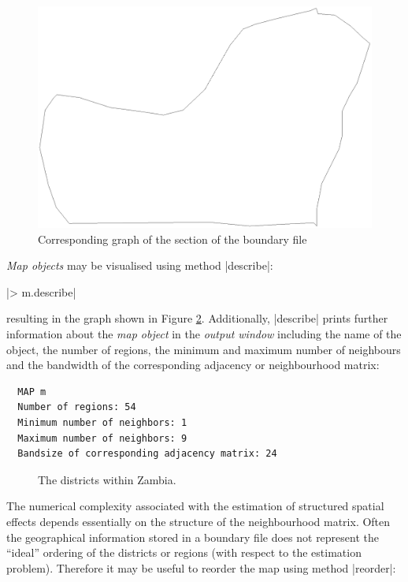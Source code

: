 \begin{figure}[h]
\centering
\includegraphics [scale=0.3]{grafiken/zambia52.ps}
\caption{\label{step:zambia52} Corresponding graph of the section of
the boundary file}
\end{figure}

{\it Map objects} may be visualised using method |describe|:

|> m.describe|

resulting in the graph shown in Figure \ref{step:zambiamap}. Additionally, |describe| prints further information about the {\it
map object} in the {\it output window} including the name of the object, the number of regions, the minimum and maximum number
of neighbours and the bandwidth of the corresponding adjacency or neighbourhood matrix:

\begin{verbatim}
  MAP m
  Number of regions: 54
  Minimum number of neighbors: 1
  Maximum number of neighbors: 9
  Bandsize of corresponding adjacency matrix: 24
\end{verbatim}

\begin{figure}[ht]
\begin{center}
 {\it\caption{The
districts within Zambia.\label{step:zambiamap}}}
\end{center}
\end{figure}


The numerical complexity associated with the estimation of structured spatial effects depends essentially on the structure of
the neighbourhood matrix. Often the geographical information stored in a boundary file does not represent the ``ideal''
ordering of the districts or regions (with respect to the estimation problem). Therefore it may be useful to reorder the map
using method |reorder|:

